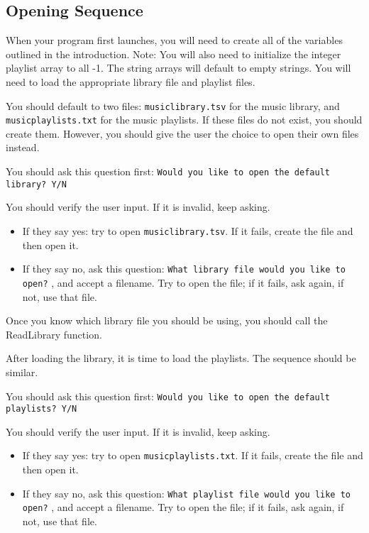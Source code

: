 \subsection{Opening Sequence \star \star}
When your program first launches, you will need to create all of the variables outlined in the introduction. Note: You will also need to initialize the integer playlist array to all -1. The string arrays will default to empty strings. You will need to load the appropriate library file and playlist files. 

You should default to two files: \texttt{musiclibrary.tsv} for the music library, and \texttt{musicplaylists.txt} for the music playlists. If these files do not exist, you should create them. However, you should give the user the choice to open their own files instead. 

You should ask this question first: \texttt{Would you like to open the default library? Y/N}

You should verify the user input. If it is invalid, keep asking.
\begin{itemize}
    \item If they say yes: try to open \texttt{musiclibrary.tsv}. If it fails, create the file and then open it.
    \item If they say no, ask this question: \texttt{What library file would you like to open?} , and accept a filename. Try to open the file; if it fails, ask again, if not, use that file.
\end{itemize}

Once you know which library file you should be using, you should call the ReadLibrary function. 

After loading the library, it is time to load the playlists. The sequence should be similar.

You should ask this question first: \texttt{Would you like to open the default playlists? Y/N}

You should verify the user input. If it is invalid, keep asking.
\begin{itemize}
    \item If they say yes: try to open \texttt{musicplaylists.txt}. If it fails, create the file and then open it.
    \item If they say no, ask this question: \texttt{What playlist file would you like to open?} , and accept a filename. Try to open the file; if it fails, ask again, if not, use that file.
\end{itemize}

